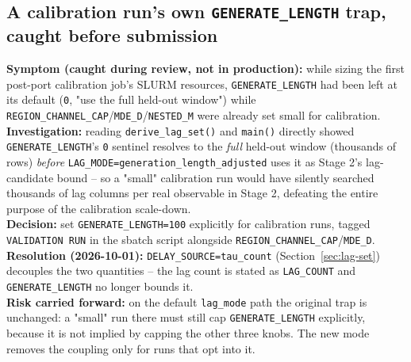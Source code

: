 \documentclass[11pt]{article}
\begin{document}
\subsection{A calibration run's own \texttt{GENERATE\_LENGTH} trap, caught before submission}
\label{sec:history-generate-length}
\textbf{Symptom (caught during review, not in production):} while sizing the first post-port calibration job's SLURM resources, \texttt{GENERATE\_LENGTH} had been left at its default (\texttt{0}, "use the full held-out window") while \texttt{REGION\_CHANNEL\_CAP}/\texttt{MDE\_D}/\texttt{NESTED\_M} were already set small for calibration.\\
\textbf{Investigation:} reading \texttt{derive\_lag\_set()} and \texttt{main()} directly showed \texttt{GENERATE\_LENGTH}'s \texttt{0} sentinel resolves to the \emph{full} held-out window (thousands of rows) \emph{before} \texttt{LAG\_MODE=generation\_length\_adjusted} uses it as Stage 2's lag-candidate bound -- so a "small" calibration run would have silently searched thousands of lag columns per real observable in Stage 2, defeating the entire purpose of the calibration scale-down.\\
\textbf{Decision:} set \texttt{GENERATE\_LENGTH=100} explicitly for calibration runs, tagged \texttt{VALIDATION RUN} in the sbatch script alongside \texttt{REGION\_CHANNEL\_CAP}/\texttt{MDE\_D}.\\
\textbf{Resolution (2026-10-01):} \texttt{DELAY\_SOURCE=tau\_count} (Section~\ref{sec:lag-set}) decouples the two quantities -- the lag count is stated as \texttt{LAG\_COUNT} and \texttt{GENERATE\_LENGTH} no longer bounds it.\\
\textbf{Risk carried forward:} on the default \texttt{lag\_mode} path the original trap is unchanged: a "small" run there must still cap \texttt{GENERATE\_LENGTH} explicitly, because it is not implied by capping the other three knobs. The new mode removes the coupling only for runs that opt into it.
\end{document}

